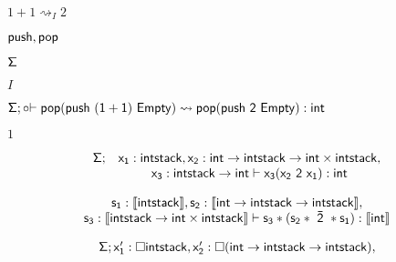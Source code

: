 \documentclass[10pt]{book}
\begin{document}
\begin{mdSnippets}
\begin{mdInlineSnippet}[4fd47922d2b9f5b8fc0bc97eeb6394fb]
$1+1\rightsquigarrow_{I} 2$\end{mdInlineSnippet}%
\begin{mdInlineSnippet}%
${\sf push, pop}$\end{mdInlineSnippet}%
\begin{mdInlineSnippet}%
${\sf \Sigma}$\end{mdInlineSnippet}%
\begin{mdInlineSnippet}[dd7536794b63bf90eccfd37f9b147d7f]%
$I$\end{mdInlineSnippet}%
\begin{mdInlineSnippet}[7b6f56cb9f8ad56e908b92d5cc3a7c1f]%
${\sf \Sigma}; {\sf \circ {\vdash pop (push \ (1+1) \ Empty)\rightsquigarrow pop (push \ 2 \ Empty) :int}}$\end{mdInlineSnippet}%
\begin{mdInlineSnippet}[c4ca4238a0b923820dcc509a6f75849b]%
$1$\end{mdInlineSnippet}%
\begin{mdDisplaySnippet}[211622c84a0cb355ffcb872b4ec84b2d]%
\[%
\begin{array}{c c}
{\sf \Sigma;}&  {\sf x_1:intstack,  x_2:int\rightarrow intstack\rightarrow int\times intstack,}\\
&  {\sf x_3:intstack\rightarrow int \vdash   x_3 (x_2 \ 2\  x_1):int} 
\end{array}
\]%
\end{mdDisplaySnippet}%
\begin{mdDisplaySnippet}%
\[%
\begin{array}{c}
{\sf s_1:\llbracket intstack\rrbracket,  s_2:\llbracket int\rightarrow intstack\rightarrow intstack\rrbracket},\\
{\sf s_3:\llbracket intstack\rightarrow int\times intstack \rrbracket \vdash   s_3 * (s_2 * \ \bar{2}\ * s_1):\llbracket int\rrbracket} 
\end{array}
\]%
\end{mdDisplaySnippet}%
\begin{mdDisplaySnippet}[b93d6314eb77d05be08e548d9f9974c3]%
\[%
\begin{array}{l}
{\sf \Sigma}; {\sf {x_1^{\prime}:\Box intstack ,x_2^{\prime}:\Box(int\rightarrow intstack\rightarrow intstack)}},\\

\end{array}\]
\end{mdDisplaySnippet}
\end{mdSnippets}
\end{document}
